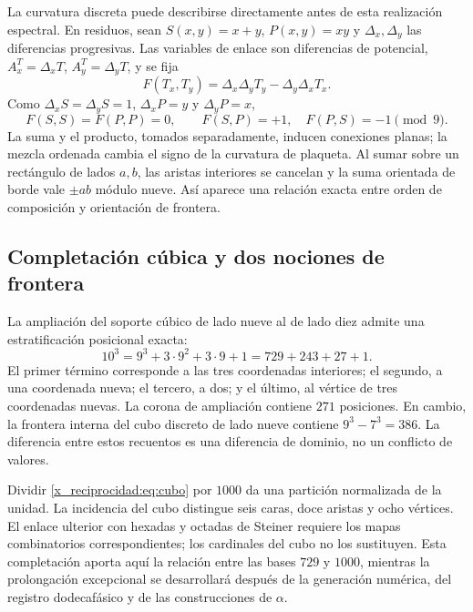 La curvatura discreta puede describirse directamente antes de esta realización espectral. En residuos, sean \(S(x,y)=x+y\), \(P(x,y)=xy\) y \(\Delta_x,\Delta_y\) las diferencias progresivas. Las variables de enlace son diferencias de potencial, \(A_x^T=\Delta_xT\), \(A_y^T=\Delta_yT\), y se fija
\[
 F(T_x,T_y)=\Delta_x\Delta_yT_y-\Delta_y\Delta_xT_x.
\]
Como \(\Delta_xS=\Delta_yS=1\), \(\Delta_xP=y\) y \(\Delta_yP=x\),
\begin{equation}
 F(S,S)=F(P,P)=0,\qquad F(S,P)=+1,\quad F(P,S)=-1\pmod9.
\end{equation}
La suma y el producto, tomados separadamente, inducen conexiones planas; la mezcla ordenada cambia el signo de la curvatura de plaqueta. Al sumar sobre un rectángulo de lados \(a,b\), las aristas interiores se cancelan y la suma orientada de borde vale \(\pm ab\) módulo nueve. Así aparece una relación exacta entre orden de composición y orientación de frontera.

\subsection{Completación cúbica y dos nociones de frontera}

La ampliación del soporte cúbico de lado nueve al de lado diez admite una estratificación posicional exacta:
\begin{equation}
 10^3=9^3+3\cdot9^2+3\cdot9+1=729+243+27+1.
 \label{x_reciprocidad:eq:cubo}
\end{equation}
El primer término corresponde a las tres coordenadas interiores; el segundo, a una coordenada nueva; el tercero, a dos; y el último, al vértice de tres coordenadas nuevas. La corona de ampliación contiene \(271\) posiciones. En cambio, la frontera interna del cubo discreto de lado nueve contiene \(9^3-7^3=386\). La diferencia entre estos recuentos es una diferencia de dominio, no un conflicto de valores.

Dividir \eqref{x_reciprocidad:eq:cubo} por \(1000\) da una partición normalizada de la unidad. La incidencia del cubo distingue seis caras, doce aristas y ocho vértices. El enlace ulterior con hexadas y octadas de Steiner requiere los mapas combinatorios correspondientes; los cardinales del cubo no los sustituyen. Esta completación aporta aquí la relación entre las bases \(729\) y \(1000\), mientras la prolongación excepcional se desarrollará después de la generación numérica, del registro dodecafásico y de las construcciones de \(\alpha\).


